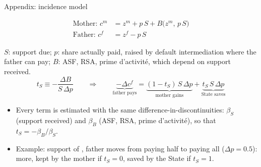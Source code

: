 \documentclass[aspectratio=169,10pt]{beamer}
\begin{document}
\begin{frame}{Appendix: incidence model}
\footnotesize
\begin{keybox}
  \vspace{-0.3cm}
  \begin{align*}
    \text{Mother: } c^m &= z^m + p\,S + B\big(z^m,\, p\,S\big) \\
    \text{Father: } c^f &= z^f - p\,S
  \end{align*}
  \vspace{-0.4cm}

  {\scriptsize $S$: support due; $p$: share actually paid, raised by default intermediation where the father can pay;
  $B$: ASF, RSA, prime d'activit\'e, which depend on support received.}
  \[
    t_S \equiv -\frac{\Delta B}{S\,\Delta p}
    \qquad\Rightarrow\qquad
    \underbrace{-\Delta c^f}_{\text{father pays}}
    = \underbrace{(1-t_S)\,S\,\Delta p}_{\text{mother gains}}
    + \underbrace{t_S\,S\,\Delta p}_{\text{State saves}}
  \]
  \vspace{-0.3cm}
\end{keybox}

\vspace{0.2cm}
\begin{itemize}
  \setlength{\itemsep}{0.1cm}
  \item Every term is estimated with the same difference-in-discontinuities: $\beta_S$ (support received)
        and $\beta_B$ (ASF, RSA, prime d'activit\'e), so that $t_S = -\beta_B/\beta_S$.
  \item Example: support of , father moves from paying half to paying all ($\Delta p = 0.5$):
         more, kept by the mother if $t_S = 0$, saved by the State if $t_S = 1$.
\end{itemize}
\end{frame}
\end{document}
